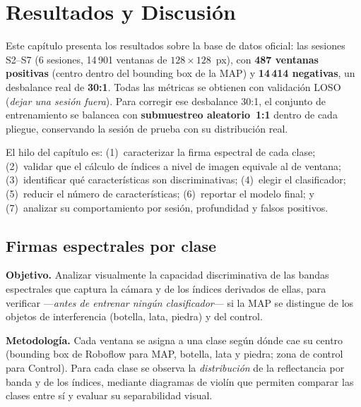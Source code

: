 \chapter{Resultados y Discusión}
\label{cap:resultados}

Este capítulo presenta los resultados sobre la base de datos oficial: las
sesiones S2--S7 (6 sesiones, 14\,901 ventanas de $128\times128$~px), con
\textbf{487 ventanas positivas} (centro dentro del bounding box de la \ac{MAP})
y \textbf{14\,414 negativas}, un desbalance real de \textbf{30:1}. Todas las
métricas se obtienen con validación \ac{LOSO} (\emph{dejar una sesión fuera}).
Para corregir ese desbalance 30:1, el conjunto de entrenamiento se balancea con
\textbf{submuestreo aleatorio~1:1} dentro de cada pliegue, conservando la sesión
de prueba con su distribución real.

El hilo del capítulo es: (1)~caracterizar la firma espectral de cada clase;
(2)~validar que el cálculo de índices a nivel de imagen equivale al de ventana;
(3)~identificar qué características son discriminativas; (4)~elegir el
clasificador; (5)~reducir el número de características; (6)~reportar el modelo
final; y (7)~analizar su comportamiento por sesión, profundidad y falsos
positivos.

\section{Firmas espectrales por clase}
\label{sec:firmas}

\textbf{Objetivo.} Analizar visualmente la capacidad discriminativa de las bandas
espectrales que captura la cámara y de los índices derivados de ellas, para verificar
---\emph{antes de entrenar ningún clasificador}--- si la \ac{MAP} se distingue de los
objetos de interferencia (botella, lata, piedra) y del control.

\textbf{Metodología.} Cada ventana se asigna a una clase según dónde cae su
centro (bounding box de Roboflow para \ac{MAP}, botella, lata y piedra; zona de
control para Control). Para cada clase se observa la \emph{distribución} de la
reflectancia por banda y de los índices, mediante diagramas de violín que
permiten comparar las clases entre sí y evaluar su separabilidad visual.

